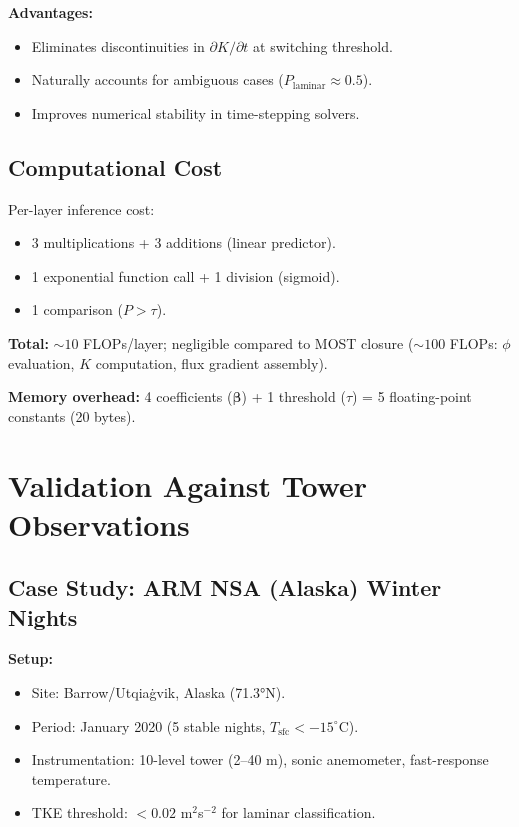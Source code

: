\documentclass[11pt]{article}
\begin{document}
\textbf{Advantages:}
\begin{itemize}[leftmargin=*]
\item Eliminates discontinuities in $\partial K/\partial t$ at switching threshold.
\item Naturally accounts for ambiguous cases ($P_{\text{laminar}} \approx 0.5$).
\item Improves numerical stability in time-stepping solvers.
\end{itemize}

\subsection{Computational Cost}

Per-layer inference cost:
\begin{itemize}[leftmargin=*]
\item 3 multiplications + 3 additions (linear predictor).
\item 1 exponential function call + 1 division (sigmoid).
\item 1 comparison ($P > \tau$).
\end{itemize}

\textbf{Total:} $\sim 10$ FLOPs/layer; negligible compared to MOST closure ($\sim 100$ FLOPs: $\phi$ evaluation, $K$ computation, flux gradient assembly).

\textbf{Memory overhead:} 4 coefficients ($\boldsymbol{\beta}$) + 1 threshold ($\tau$) = 5 floating-point constants (20 bytes).

\section{Validation Against Tower Observations}

\subsection{Case Study: ARM NSA (Alaska) Winter Nights}

\textbf{Setup:}
\begin{itemize}[leftmargin=*]
\item Site: Barrow/Utqia\.gvik, Alaska (71.3°N).
\item Period: January 2020 (5 stable nights, $T_{\text{sfc}} < -15^\circ$C).
\item Instrumentation: 10-level tower (2--40 m), sonic anemometer, fast-response temperature.
\item TKE threshold: $<0.02$ m$^2$s$^{-2}$ for laminar classification.
\end{itemize}
\end{document}
